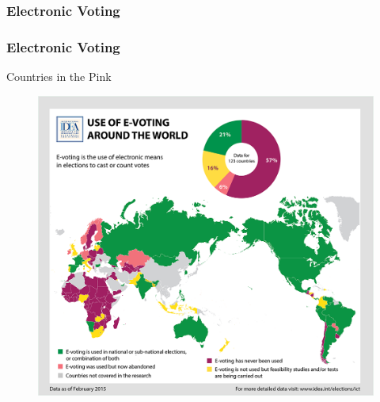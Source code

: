 \documentclass{beamer}
\begin{document}
\begin{frame}
\frametitle{Electronic Voting}
\begin{center}
\end{center}
\end{frame}




\begin{frame}
\frametitle{Electronic Voting}
{Countries in the Pink}
\begin{figure}
\includegraphics[scale=0.20]{e-voting-map.png}
\end{figure}
\end{frame}
\end{document}
